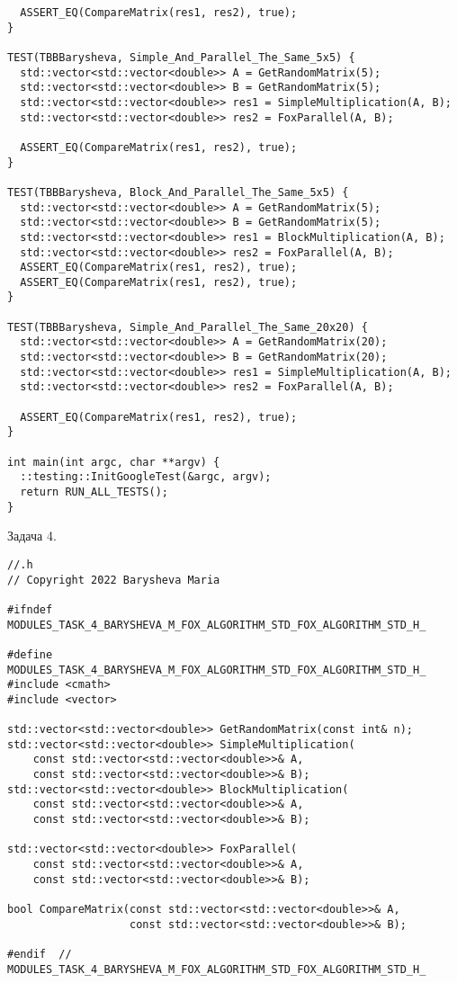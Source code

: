 \documentclass[12pt]{article}
\begin{document}
\begin{lstlisting}
  ASSERT_EQ(CompareMatrix(res1, res2), true);
}

TEST(TBBBarysheva, Simple_And_Parallel_The_Same_5x5) {
  std::vector<std::vector<double>> A = GetRandomMatrix(5);
  std::vector<std::vector<double>> B = GetRandomMatrix(5);
  std::vector<std::vector<double>> res1 = SimpleMultiplication(A, B);
  std::vector<std::vector<double>> res2 = FoxParallel(A, B);

  ASSERT_EQ(CompareMatrix(res1, res2), true);
}

TEST(TBBBarysheva, Block_And_Parallel_The_Same_5x5) {
  std::vector<std::vector<double>> A = GetRandomMatrix(5);
  std::vector<std::vector<double>> B = GetRandomMatrix(5);
  std::vector<std::vector<double>> res1 = BlockMultiplication(A, B);
  std::vector<std::vector<double>> res2 = FoxParallel(A, B);
  ASSERT_EQ(CompareMatrix(res1, res2), true);
  ASSERT_EQ(CompareMatrix(res1, res2), true);
}

TEST(TBBBarysheva, Simple_And_Parallel_The_Same_20x20) {
  std::vector<std::vector<double>> A = GetRandomMatrix(20);
  std::vector<std::vector<double>> B = GetRandomMatrix(20);
  std::vector<std::vector<double>> res1 = SimpleMultiplication(A, B);
  std::vector<std::vector<double>> res2 = FoxParallel(A, B);

  ASSERT_EQ(CompareMatrix(res1, res2), true);
}

int main(int argc, char **argv) {
  ::testing::InitGoogleTest(&argc, argv);
  return RUN_ALL_TESTS();
}
\end{lstlisting}
\par Задача 4.
\begin{lstlisting}
//.h
// Copyright 2022 Barysheva Maria

#ifndef MODULES_TASK_4_BARYSHEVA_M_FOX_ALGORITHM_STD_FOX_ALGORITHM_STD_H_

#define MODULES_TASK_4_BARYSHEVA_M_FOX_ALGORITHM_STD_FOX_ALGORITHM_STD_H_
#include <cmath>
#include <vector>

std::vector<std::vector<double>> GetRandomMatrix(const int& n);
std::vector<std::vector<double>> SimpleMultiplication(
    const std::vector<std::vector<double>>& A,
    const std::vector<std::vector<double>>& B);
std::vector<std::vector<double>> BlockMultiplication(
    const std::vector<std::vector<double>>& A,
    const std::vector<std::vector<double>>& B);

std::vector<std::vector<double>> FoxParallel(
    const std::vector<std::vector<double>>& A,
    const std::vector<std::vector<double>>& B);

bool CompareMatrix(const std::vector<std::vector<double>>& A,
                   const std::vector<std::vector<double>>& B);

#endif  // MODULES_TASK_4_BARYSHEVA_M_FOX_ALGORITHM_STD_FOX_ALGORITHM_STD_H_

\end{lstlisting}
\end{document}
